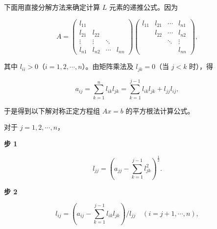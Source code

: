 \documentclass[
  10pt,
  fontset=fandol]{ctexart}
\begin{document}
下面用直接分解方法来确定计算 \(L\) 元素的递推公式。因为

\[
A=\begin{pmatrix}
l_{11}&&&\\
l_{21}&l_{22}&&\\
\vdots&\vdots&\ddots&\\
l_{n1}&l_{n2}&\cdots&l_{nn}
\end{pmatrix}
\begin{pmatrix}
l_{11}&l_{21}&\cdots&l_{n1}\\
&l_{22}&\cdots&l_{n2}\\
&&\ddots&\vdots\\
&&&l_{nn}
\end{pmatrix},
\]

其中 \(l_{ii}>0\)（\(i=1,2,\cdots,n\)）。由矩阵乘法及 \(l_{jk}=0\)（当 \(j<k\) 时），得

\[a_{ij}=\sum_{k=1}^{n}l_{ik}l_{jk}=\sum_{k=1}^{j-1}l_{ik}l_{jk}+l_{jj}l_{ij},\]

于是得到以下解对称正定方程组 \(Ax=b\) 的平方根法计算公式。

对于 \(j=1,2,\cdots,n\)，

\textbf{步 1}

\[l_{jj}=\left(a_{jj}-\sum_{k=1}^{j-1}l_{jk}^2\right)^{\frac12}.\tag{7.4.7}\]

\textbf{步 2}

\[l_{ij}=\left(a_{ij}-\sum_{k=1}^{j-1}l_{ik}l_{jk}\right)/l_{jj}\quad(i=j+1,\cdots,n),\]
\end{document}
